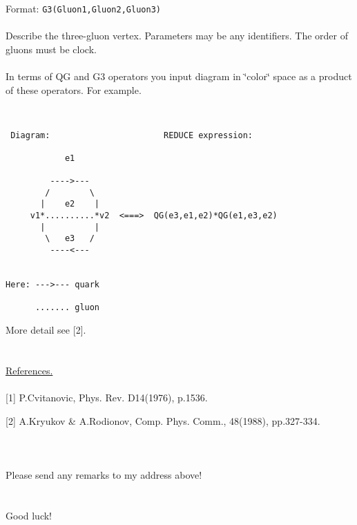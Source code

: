 Format: {\tt G3(Gluon1,Gluon2,Gluon3)} \\
\ \\
Describe the three-gluon vertex. Parameters may be any identifiers.
The order of gluons must be clock. \\
\ \\
In terms of QG and G3 operators you input diagram in \char`\"{}color\char`\"{}
space as a product of these operators. For example. 

\begin{verbatim}


 Diagram:                       REDUCE expression:

            e1

         ---->---
        /        \
       |    e2    |
     v1*..........*v2  <===>  QG(e3,e1,e2)*QG(e1,e3,e2)
       |          |
        \   e3   /
         ----<---


Here: --->--- quark

      ....... gluon

\end{verbatim}

More detail see {[}2{]}. \\
\ \\
\ \\
\underline{References.} \\ 
\ \\
{[}1{]} P.Cvitanovic, Phys. Rev. D14(1976), p.1536.

{[}2{]} A.Kryukov \& A.Rodionov, Comp. Phys. Comm., 48(1988), pp.327-334.\\
\ \\
\ \\
\ \\
Please send any remarks to my address above! \\
\ \\
\ \\
Good luck!
